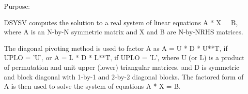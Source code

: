  \begin{DoxyParagraph}{Purpose\+: }
\begin{DoxyVerb} DSYSV computes the solution to a real system of linear equations
    A * X = B,
 where A is an N-by-N symmetric matrix and X and B are N-by-NRHS
 matrices.

 The diagonal pivoting method is used to factor A as
    A = U * D * U**T,  if UPLO = 'U', or
    A = L * D * L**T,  if UPLO = 'L',
 where U (or L) is a product of permutation and unit upper (lower)
 triangular matrices, and D is symmetric and block diagonal with
 1-by-1 and 2-by-2 diagonal blocks.  The factored form of A is then
 used to solve the system of equations A * X = B.\end{DoxyVerb}
 
\end{DoxyParagraph}

